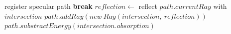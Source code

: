 \begin{algorithm}
\begin{algorithmic}[1]
                    \State{} register specular path 
                    \State{} \textbf{break}
                \EndIf{}
              \State{} $reflection \gets$ reflect $path.currentRay$ with $intersection$
              \State{} $path.addRay(new~Ray(intersection,~reflection))$
              \State{} $path.substractEnergy(intersection.absorption)$
              \EndIf{}
              \EndFor{}
            \EndFor{}
        \EndFor{}

    \EndProcedure{}
  \end{algorithmic}
\end{algorithm}


